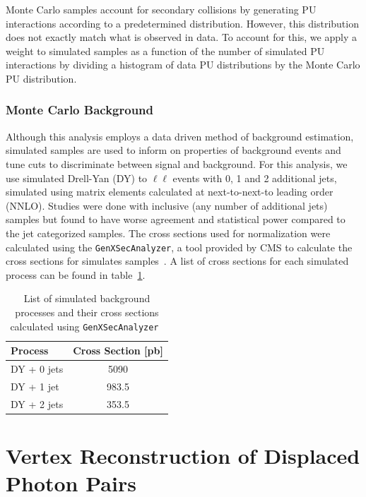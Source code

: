 Monte Carlo samples account for secondary collisions by generating PU interactions according to a predetermined distribution. However, this distribution does not exactly match what is observed in data. To account for this, we apply a weight to simulated samples as a function of the number of simulated PU interactions by dividing a histogram of data PU distributions by the Monte Carlo PU distribution.  %


\subsubsection{Monte Carlo Background} \label{sec:ana_mcbkg}
Although this analysis employs a data driven method of background estimation, simulated samples are used to inform on properties of background events and tune cuts to discriminate between signal and background. For this analysis, we use simulated Drell-Yan (DY) to $\ell\ell$ events with 0, 1 and 2 additional jets, simulated using matrix elements calculated at next-to-next-to leading order (NNLO). Studies were done with inclusive (any number of additional jets) samples but found to have worse agreement and statistical power compared to the jet categorized samples. The cross sections used for normalization were calculated using the \texttt{GenXSecAnalyzer}, a tool provided by CMS to calculate the cross sections for simulates samples~\cite{genxsecana}. A list of cross sections for each simulated process can be found in table~\ref{tab:mcsamples}.

\begin{table}[htb!]
	\centering
	\caption[List of simulated background processes and their cross sections calculated using \texttt{GenXSecAnalyzer}~\cite{genxsecana}]
	{List of simulated background processes and their cross sections calculated using \texttt{GenXSecAnalyzer}~\cite{genxsecana}}
	\label{tab:mcsamples}
	\begin{tabular}{l c}\hline
		Process & Cross Section [pb]\\
		\hline
		DY + 0 jets & 5090\\
		DY + 1 jet & 983.5\\
		DY + 2 jets & 353.5\\
		\hline
	\end{tabular}
	
\end{table}

\section{Vertex Reconstruction of Displaced Photon Pairs} \label{sec:ana_vertex}
